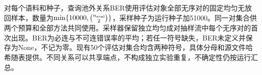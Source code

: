 对每个语料和种子，查询池外关系BER使用评估对象全部无序对的固定均匀无放回样本，数量为$\min\{10000,\binom{n_{\rm eval}}{2}\}$，采样种子为运行种子加51000。同一对集合供两个预算和全部方法共同使用。采样器保留独立均匀成对抽样流中每个无序对的首次出现。BER为必连与不可连错误率的平均；若任一符号缺失，BER未定义并保存为None，不记为零。现有50个评估对集合均含两种符号，具体分母和源文件哈希随表提供。不同关系可以共享端点，不构成独立实验重复，不确定性仍按运行汇总。
